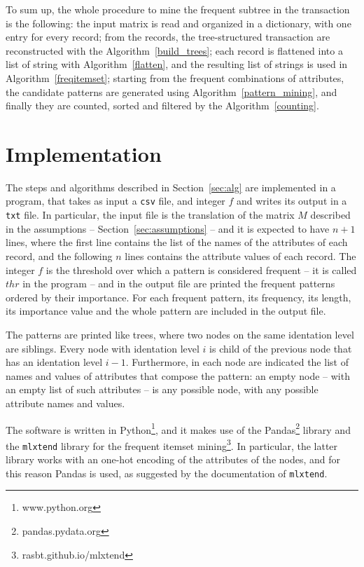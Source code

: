 \documentclass{acm_proc_article-sp-sigmod09}
\begin{document}
To sum up, the whole procedure to mine the frequent subtree in the transaction is the following: the input matrix is read and organized in a dictionary, with one entry for every record; from the records, the tree-structured transaction are reconstructed with the Algorithm~\ref{build_trees}; each record is flattened into a list of string with Algorithm~\ref{flatten}, and the resulting list of strings is used in Algorithm~\ref{freqitemset}; starting from the frequent combinations of attributes, the candidate patterns are generated using Algorithm~\ref{pattern_mining}, and finally they are counted, sorted and filtered by the Algorithm~\ref{counting}.

\section{Implementation}
The steps and algorithms described in Section~\ref{sec:alg} are implemented in a program, that takes as input a \texttt{csv} file, and integer $f$ and writes its output in a \texttt{txt} file. In particular, the input file is the translation of the matrix $M$ described in the assumptions -- Section~\ref{sec:assumptions} -- and it is expected to have $n + 1$ lines, where the first line contains the list of the names of the attributes of each record, and the following $n$ lines contains the attribute values of each record. The integer $f$ is the threshold over which a pattern is considered frequent -- it is called $thr$ in the program -- and in the output file are printed the frequent patterns ordered by their importance. For each frequent pattern, its frequency, its length, its importance value and the whole pattern are included in the output file. 

The patterns are printed like trees, where two nodes on the same identation level are siblings. Every node with identation level $i$ is child of the previous node that has an identation level $i - 1$. Furthermore, in each node are indicated the list of names and values of attributes that compose the pattern: an empty node -- with an empty list of such attributes -- is any possible node, with any possible attribute names and values.

The software is written in Python\footnote{www.python.org}, and it makes use of the Pandas\footnote{pandas.pydata.org} library \cite{mckinney2010data} and the \texttt{mlxtend} library for the frequent itemset mining\footnote{rasbt.github.io/mlxtend}. In particular, the latter library works with an one-hot encoding of the attributes of the nodes, and for this reason Pandas is used, as suggested by the documentation of \texttt{mlxtend}.
\end{document}

